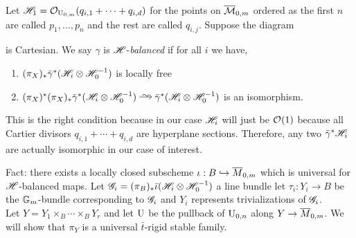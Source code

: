 \documentclass[12pt]{article}
\begin{document}
\begin{defn}
Let $\mathscr{H}_1 = \mathcal{O}_{\mathrm{U}_{0,m}}(q_{i,1} + \cdots + q_{i,d})$ for the points on $\overline{\mathcal{M}}_{0,m}$ ordered as the first $n$ are called $p_1, \dots, p_n$ and the rest are called $q_{i,j}$. 
Suppose the diagram
\begin{center}
\end{center}
is Cartesian. We say $\gamma$ is $\mathscr{H}$-\textit{balanced} if for all $i$ we have,
\begin{enumerate}
\item $(\pi_X)_* \bar{\gamma}^* (\mathscr{H}_i \otimes \mathscr{H}_0^{-1})$ is locally free
\item $(\pi_X)^* (\pi_X)_*  \bar{\gamma}^* (\H_i \ot \H_0^{-1}) \iso  \bar{\gamma}^* (\H_i \ot \H_0^{-1})$ is an isomorphism. 
\end{enumerate}
\end{defn}

\begin{rmk}
This is the right condition because in our case $\mathscr{H}_i$ will just be $\mathcal{O}_{}(1)$ because all Cartier divisors $q_{i,1} + \cdots + q_{i,d}$ are hyperplane sections. Therefore, any two $\bar{\gamma}^* \mathscr{H}_i$ are actually isomorphic in our case of interest. 
\end{rmk}

Fact: there exists a locally closed subscheme $\iota: B \hookrightarrow \overline{M}_{0,m}$ which is universal for $\mathscr{H}$-balanced maps. Let $\mathscr{G}_i = (\pi_B)_* \bar{\iota} (\mathscr{H}_i \otimes \mathscr{H}_0^{-1})$ a line bundle let $\tau_i : Y_i \to B$ be the $\mathbb{G}_m$-bundle corresponding to $\mathscr{G}_i$ and $Y_i$ represents trivializations of $\mathscr{G}_i$. 
\bigskip\\
Let $Y = Y_1 \times_B \cdots \times_B Y_r$ and let $\mathrm{U}$ be the pullback of $\mathrm{U}_{0,n}$ along $Y \to \overline{M}_{0,m}$. We will show that $\pi_Y$ is a universal $\bar{t}$-rigid stable family. 
\end{document}
